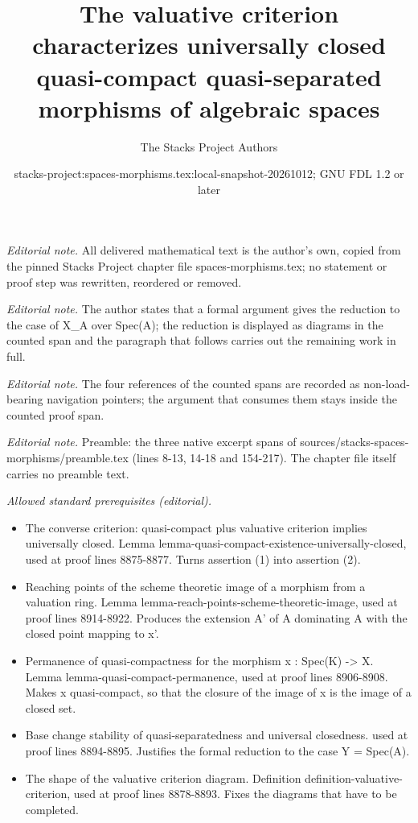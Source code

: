 \documentclass[10pt,a4paper]{amsart}
\title{The valuative criterion characterizes universally closed quasi-compact quasi-separated morphisms of algebraic spaces}
\author{The Stacks Project Authors}
\date{stacks-project:spaces-morphisms.tex:local-snapshot-20261012; GNU FDL 1.2 or later}
\theoremstyle{plain}
\theoremstyle{definition}
\theoremstyle{remark}
\numberwithin{equation}{subsection}
\begin{document}
\maketitle
\setcounter{subsection}{1}
\noindent\textit{Editorial note.} All delivered mathematical text is the author's own, copied from the pinned Stacks Project chapter file spaces-morphisms.tex; no statement or proof step was rewritten, reordered or removed.\par\medskip
\noindent\textit{Editorial note.} The author states that a formal argument gives the reduction to the case of X\_A over Spec(A); the reduction is displayed as diagrams in the counted span and the paragraph that follows carries out the remaining work in full.\par\medskip
\noindent\textit{Editorial note.} The four references of the counted spans are recorded as non-load-bearing navigation pointers; the argument that consumes them stays inside the counted proof span.\par\medskip
\noindent\textit{Editorial note.} Preamble: the three native excerpt spans of sources/stacks-spaces-morphisms/preamble.tex (lines 8-13, 14-18 and 154-217). The chapter file itself carries no preamble text.\par\medskip
\noindent\textit{Allowed standard prerequisites (editorial).}\begin{itemize}
\item The converse criterion: quasi-compact plus valuative criterion implies universally closed. Lemma lemma-quasi-compact-existence-universally-closed, used at proof lines 8875-8877. Turns assertion (1) into assertion (2).
\item Reaching points of the scheme theoretic image of a morphism from a valuation ring. Lemma lemma-reach-points-scheme-theoretic-image, used at proof lines 8914-8922. Produces the extension A' of A dominating A with the closed point mapping to x'.
\item Permanence of quasi-compactness for the morphism x : Spec(K) -> X. Lemma lemma-quasi-compact-permanence, used at proof lines 8906-8908. Makes x quasi-compact, so that the closure of the image of x is the image of a closed set.
\item Base change stability of quasi-separatedness and universal closedness. used at proof lines 8894-8895. Justifies the formal reduction to the case Y = Spec(A).
\item The shape of the valuative criterion diagram. Definition definition-valuative-criterion, used at proof lines 8878-8893. Fixes the diagrams that have to be completed.
\end{itemize}\medskip
\end{document}
